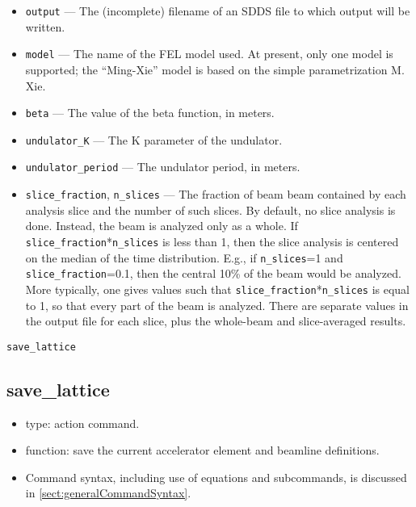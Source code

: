 \documentclass[11pt]{article}
\begin{document}
\begin{itemize}
\item \verb|output| --- The (incomplete) filename of an SDDS file to which output will be
written.
\item \verb|model| --- The name of the FEL model used.  At present, only one model is
supported; the ``Ming-Xie'' model is based on the simple parametrization M. Xie\cite{MingXie}.
\item \verb|beta| --- The value of the beta function, in meters.
\item \verb|undulator_K| --- The K parameter of the undulator.
\item \verb|undulator_period| --- The undulator period, in meters.
\item \verb|slice_fraction|, \verb|n_slices| --- The fraction of beam beam contained by each analysis slice
        and the number of such slices.
        By default, no slice analysis is done.  Instead, the beam is analyzed only as a whole.
        If \verb|slice_fraction|*\verb|n_slices| is less than 1, then the slice analysis
        is centered on the median of the time distribution.  E.g., if \verb|n_slices|=1 and
        \verb|slice_fraction|=0.1, then the central 10\% of the beam would be analyzed.
        More typically, one gives values such that \verb|slice_fraction|*\verb|n_slices| is
        equal to 1, so that every part of the beam is analyzed.  There are separate values in
        the output file for each slice, plus the whole-beam and slice-averaged results.
\end{itemize}

\newpage
\begin{center}{\Large\verb|save_lattice|}\end{center}
\subsection{save\_lattice \label{subsec:savelattice}}

\begin{itemize}
\item type: action command.
\item function: save the current accelerator element and beamline definitions.
\item Command syntax, including use of equations and subcommands, is discussed in \ref{sect:generalCommandSyntax}.
\end{itemize}
\end{document}
